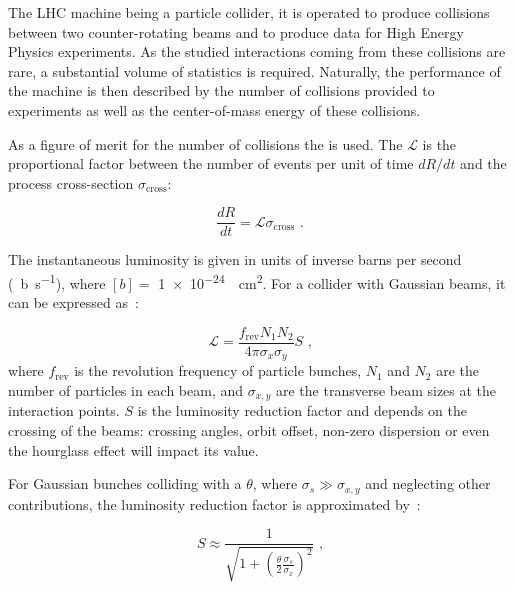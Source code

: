 The LHC machine being a particle collider, it is operated to produce collisions between two counter-rotating beams and to produce data for High Energy Physics experiments.
As the studied interactions coming from these collisions are rare, a substantial volume of statistics is required. 
Naturally, the performance of the machine is then described by the number of collisions provided to experiments as well as the center-of-mass energy of these collisions.

As a figure of merit for the number of collisions the  is used.
The  \(\mathcal{L}\) is the proportional factor between the number of events per unit of time \(dR / dt\) and the process cross-section \(\sigma_{\mathrm{cross}}\):

\begin{equation}
    \dfrac{dR}{dt} = \mathcal{L} \sigma_{\mathrm{cross}} \text{ .}
    \label{equation:instantaneous_luminosity_definition}
\end{equation}

The instantaneous luminosity is given in units of inverse barns per second (\unit{\per\barn\per\second}), where \(\left[ b \right] = \) \qty{1e-24}{\per\square\centi\meter}.
For a collider with Gaussian beams, it can be expressed as~\cite{CERN:Herr:Concept_Luminosity}:

\begin{equation}
    \mathcal{L} = \frac{f_{\mathrm{rev}} N_1 N_2}{4 \pi \sigma_x \sigma_y} S \text{ ,}
    \label{equation:luminosity_gaussian_beams}
\end{equation}
where \(f_{\mathrm{rev}}\) is the revolution frequency of particle bunches, \(N_1\) and \(N_2\) are the number of particles in each beam, and \(\sigma_{x,y}\) are the transverse beam sizes at the interaction points.
\(S\) is the luminosity reduction factor and depends on the crossing of the beams: crossing angles, orbit offset, non-zero dispersion or even the hourglass effect will impact its value.

For Gaussian bunches colliding with a  \(\theta\), where \(\sigma_s \gg \sigma_{x,y}\) and neglecting other contributions, the luminosity reduction factor is approximated by~\cite{CERN:Herr:Concept_Luminosity}:

\begin{equation}
    S \approx \frac{1}{\sqrt{1 + \left( \frac{\theta}{2} \frac{\sigma_s}{\sigma_x} \right)^2}} \text{ ,}
    \label{equation:luminosity_reduction_factor}
\end{equation}

